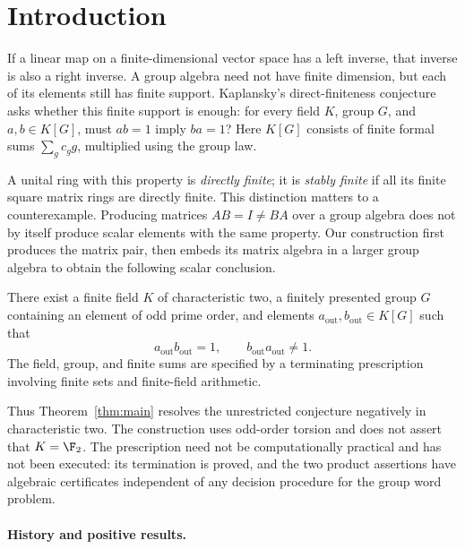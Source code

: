 \section{Introduction}
\label{sec:introduction}

If a linear map on a finite-dimensional vector space has a left inverse, that inverse is also a right inverse. A group algebra need not have finite dimension, but each of its elements still has finite support. Kaplansky's direct-finiteness conjecture asks whether this finite support is enough: for every field $K$, group $G$, and $a,b\in K[G]$, must $ab=1$ imply $ba=1$? Here $K[G]$ consists of finite formal sums $\sum_g c_g g$, multiplied using the group law.

A unital ring with this property is \emph{directly finite}; it is \emph{stably finite} if all its finite square matrix rings are directly finite. This distinction matters to a counterexample. Producing matrices $AB=I\ne BA$ over a group algebra does not by itself produce scalar elements with the same property. Our construction first produces the matrix pair, then embeds its matrix algebra in a larger group algebra to obtain the following scalar conclusion.

\begin{theorem}
\label{thm:main}
There exist a finite field $K$ of characteristic two, a finitely presented group $G$ containing an element of odd prime order, and elements $a_{\mathrm{out}},b_{\mathrm{out}}\in K[G]$ such that
\[
a_{\mathrm{out}}b_{\mathrm{out}}=1,
\qquad b_{\mathrm{out}}a_{\mathrm{out}}\ne1.
\]
The field, group, and finite sums are specified by a terminating prescription involving finite sets and finite-field arithmetic.
\end{theorem}

Thus Theorem~\ref{thm:main} resolves the unrestricted conjecture negatively in characteristic two. The construction uses odd-order torsion and does not assert that $K=\F_2$. The prescription need not be computationally practical and has not been executed: its termination is proved, and the two product assertions have algebraic certificates independent of any decision procedure for the group word problem.

\paragraph{History and positive results.}
